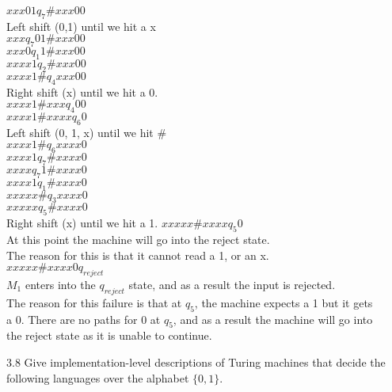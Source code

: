 \documentclass[12pt]{article}
\begin{document}
$xxx01              q_7       \# xxx00$ \\
Left shift (0,1) until we hit a x       \\
$xxx                q_7    01 \# xxx00$ \\
$xxx0               q_1     1 \# xxx00$ \\
$xxxx1              q_2       \# xxx00$ \\
$xxxx1 \#           q_4          xxx00$ \\
Right shift (x) until we hit a 0.       \\
$xxxx1 \# xxx       q_4             00$ \\
$xxxx1 \# xxxx      q_6              0$ \\
Left shift (0, 1, x) until we hit  $\#$ \\
$xxxx1 \#           q_6          xxxx0$ \\
$xxxx1              q_7      \#  xxxx0$ \\
$xxxx               q_7    1 \#  xxxx0$ \\
$xxxx1              q_1      \#  xxxx0$ \\
$xxxxx  \#          q_3          xxxx0$ \\
$xxxxx              q_5      \#  xxxx0$ \\
Right shift (x) until we hit a 1.
$xxxxx \#  xxxx     q_5              0$ \\
At this point the machine will go into the reject state. \\
The reason for this is that it cannot read a 1, or an x. \\
$xxxxx \#  xxxx0    q_{reject}        $ \\
$M_1$ enters into the $q_{reject}$ state, and as a result the input is rejected. \\

The reason for this failure is that at $q_5$, the machine expects a 1 but it gets \\
a 0. There are no paths for 0 at $q_5$, and as a result the machine will go into \\
the reject state as it is unable to continue. \\


\pagebreak

3.8 Give implementation-level descriptions of Turing machines that decide the following
languages over the alphabet $\{0,1\}$. \\
\end{document}

